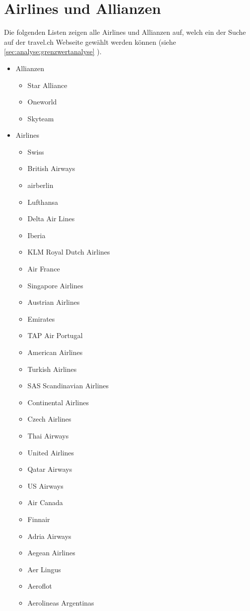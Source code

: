 \chapter{Airlines und Allianzen}
\label{app:airlines}
Die folgenden Listen zeigen alle Airlines und Allianzen auf, welch ein der Suche auf der travel.ch Webseite gewählt werden können (siehe \cref{sec:analyse:grenzwertanalyse} ).
\begin{itemize}
\item Allianzen
	\begin{itemize}
	\item Star Alliance
	\item Oneworld
	\item Skyteam
	\end{itemize}
\item Airlines
	\begin{itemize}
	\item Swiss
	\item British Airways
	\item airberlin
	\item Lufthansa
	\item Delta Air Lines
	\item Iberia
	\item KLM Royal Dutch Airlines
	\item Air France
	\item Singapore Airlines
	\item Austrian Airlines
	\item Emirates
	\item TAP Air Portugal
	\item American Airlines
	\item Turkish Airlines
	\item SAS Scandinavian Airlines
	\item Continental Airlines
	\item Czech Airlines
	\item Thai Airways
	\item United Airlines
	\item Qatar Airways
	\item US Airways
	\item Air Canada
	\item Finnair
	\item Adria Airways
	\item Aegean Airlines
	\item Aer Lingus
	\item Aeroflot
	\item Aerolineas Argentinas

\end{itemize}
\end{itemize}
